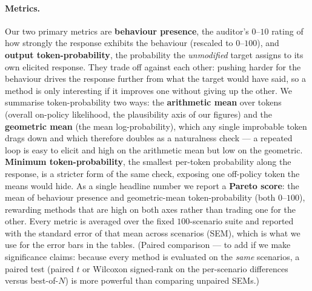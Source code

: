 \documentclass{article}
\theoremstyle{plain}
\theoremstyle{definition}
\theoremstyle{remark}
\begin{document}
\paragraph{Metrics.}
Our two primary metrics are \textbf{behaviour presence}, the auditor's $0$--$10$ rating of how strongly the response exhibits the behaviour (rescaled to $0$--$100$), and \textbf{output token-probability}, the probability the \emph{unmodified} target assigns to its own elicited response. They trade off against each other: pushing harder for the behaviour drives the response further from what the target would have said, so a method is only interesting if it improves one without giving up the other.
We summarise token-probability two ways: the \textbf{arithmetic mean} over tokens (overall on-policy likelihood, the plausibility axis of our figures) and the \textbf{geometric mean} (the mean log-probability), which any single improbable token drags down and which therefore doubles as a naturalness check --- a repeated loop is easy to elicit and high on the arithmetic mean but low on the geometric. \textbf{Minimum token-probability}, the smallest per-token probability along the response, is a stricter form of the same check, exposing one off-policy token the means would hide. As a single headline number we report a \textbf{Pareto score}: the mean of behaviour presence and geometric-mean token-probability (both $0$--$100$), rewarding methods that are high on both axes rather than trading one for the other.
Every metric is averaged over the fixed $100$-scenario suite and reported with the standard error of that mean across scenarios (SEM), which is what we use for the error bars in the tables.
{\color{blue}(Paired comparison --- to add if we make significance claims: because every method is evaluated on the \emph{same} scenarios, a paired test (paired $t$ or Wilcoxon signed-rank on the per-scenario differences versus best-of-$N$) is more powerful than comparing unpaired SEMs.)}
\end{document}
